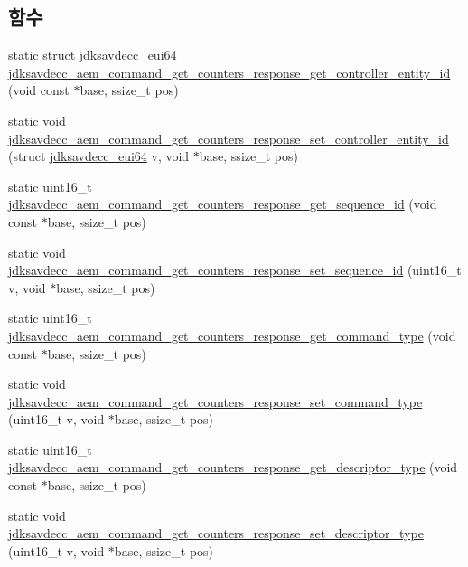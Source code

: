 \subsection*{함수}
\begin{DoxyCompactItemize}
\item 
static struct \hyperlink{structjdksavdecc__eui64}{jdksavdecc\+\_\+eui64} \hyperlink{group__command__get__counters__response_ga586bec25e2630f303a57659979e618a1}{jdksavdecc\+\_\+aem\+\_\+command\+\_\+get\+\_\+counters\+\_\+response\+\_\+get\+\_\+controller\+\_\+entity\+\_\+id} (void const $\ast$base, ssize\+\_\+t pos)
\item 
static void \hyperlink{group__command__get__counters__response_gad9ea7edb48115468a615b5a0308a75ed}{jdksavdecc\+\_\+aem\+\_\+command\+\_\+get\+\_\+counters\+\_\+response\+\_\+set\+\_\+controller\+\_\+entity\+\_\+id} (struct \hyperlink{structjdksavdecc__eui64}{jdksavdecc\+\_\+eui64} v, void $\ast$base, ssize\+\_\+t pos)
\item 
static uint16\+\_\+t \hyperlink{group__command__get__counters__response_gaa4168e93b786e019eacd1cb97bbebe94}{jdksavdecc\+\_\+aem\+\_\+command\+\_\+get\+\_\+counters\+\_\+response\+\_\+get\+\_\+sequence\+\_\+id} (void const $\ast$base, ssize\+\_\+t pos)
\item 
static void \hyperlink{group__command__get__counters__response_ga998f61ac16dfaead1bfdb582b355f5c3}{jdksavdecc\+\_\+aem\+\_\+command\+\_\+get\+\_\+counters\+\_\+response\+\_\+set\+\_\+sequence\+\_\+id} (uint16\+\_\+t v, void $\ast$base, ssize\+\_\+t pos)
\item 
static uint16\+\_\+t \hyperlink{group__command__get__counters__response_ga02751d64741405db332da41abec15b44}{jdksavdecc\+\_\+aem\+\_\+command\+\_\+get\+\_\+counters\+\_\+response\+\_\+get\+\_\+command\+\_\+type} (void const $\ast$base, ssize\+\_\+t pos)
\item 
static void \hyperlink{group__command__get__counters__response_gaa9ab20ecf104b164ba8bc00cf5230083}{jdksavdecc\+\_\+aem\+\_\+command\+\_\+get\+\_\+counters\+\_\+response\+\_\+set\+\_\+command\+\_\+type} (uint16\+\_\+t v, void $\ast$base, ssize\+\_\+t pos)
\item 
static uint16\+\_\+t \hyperlink{group__command__get__counters__response_gaeb2014fe7143c09e4d7dd849dde4881f}{jdksavdecc\+\_\+aem\+\_\+command\+\_\+get\+\_\+counters\+\_\+response\+\_\+get\+\_\+descriptor\+\_\+type} (void const $\ast$base, ssize\+\_\+t pos)
\item 
static void \hyperlink{group__command__get__counters__response_gaa10abcd806ddc466372aa518d44e2e8a}{jdksavdecc\+\_\+aem\+\_\+command\+\_\+get\+\_\+counters\+\_\+response\+\_\+set\+\_\+descriptor\+\_\+type} (uint16\+\_\+t v, void $\ast$base, ssize\+\_\+t pos)

\end{DoxyCompactItemize}
